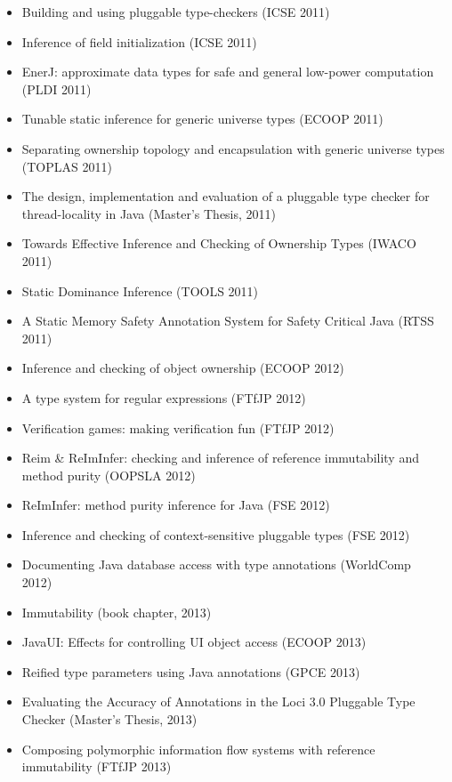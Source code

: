 \begin{itemize}
\item
  Building and using pluggable type-checkers (ICSE 2011)~\cite{DietlDEMS2011}
\item
  Inference of field initialization (ICSE 2011)~\cite{SpotoE2011}
\item
  EnerJ: approximate data types for safe and general low-power computation
  (PLDI 2011)~\cite{SampsonDFGCG2011}
\item
  Tunable static inference for generic universe types (ECOOP 2011)~\cite{DietlEM2011}
\item
  Separating ownership topology and encapsulation with generic universe
  types (TOPLAS 2011)~\cite{DietlDM2011}
\item
  The design, implementation and evaluation of a pluggable type checker for
  thread-locality in Java (Master's Thesis, 2011)~\cite{Sherwany2011}
\item
  Towards Effective Inference and Checking of Ownership Types (IWACO 2011)~\cite{HuangM2011}
\item
  Static Dominance Inference (TOOLS 2011)~\cite{MilanovaV2011}
\item
  A Static Memory Safety Annotation System for Safety Critical Java (RTSS 2011)~\cite{TangPNV2011}

\item
  Inference and checking of object ownership (ECOOP 2012)~\cite{HuangDME2012}
\item
  A type system for regular expressions (FTfJP 2012)~\cite{SpishakDE2012}
\item
  Verification games: making verification fun (FTfJP 2012)~\cite{DietlDEMWCPP2012}
\item
  Reim \& ReImInfer: checking and inference of reference immutability and
  method purity (OOPSLA 2012)~\cite{HuangMDE2012}
\item
  ReImInfer: method purity inference for Java (FSE 2012)~\cite{HuangM2012}
\item
  Inference and checking of context-sensitive pluggable types (FSE 2012)~\cite{MilanovaH2012}
\item
  Documenting Java database access with type annotations (WorldComp 2012)~\cite{Bergstein2012}

\item
  Immutability (book chapter, 2013)~\cite{PotaninOZE2013}
\item
  JavaUI: Effects for controlling UI object access (ECOOP 2013)~\cite{GordonDEG2013}
\item
  Reified type parameters using Java annotations (GPCE 2013)~\cite{GerakiosBS2013}
\item
  Evaluating the Accuracy of Annotations in the Loci 3.0 Pluggable Type
  Checker (Master's Thesis, 2013)~\cite{Zaza2013}
\item
  Composing polymorphic information flow systems with reference
  immutability (FTfJP 2013)~\cite{MilanovaH2013}



\end{itemize}
